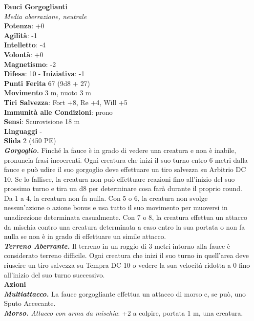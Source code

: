 \begin{multicols}{2}
\medskip\textbf{Fauci Gorgoglianti}\\
\emph{Media aberrazione, neutrale}\\
\textbf{Potenza}: +0\\
\textbf{Agilità}: -1\\
\textbf{Intelletto}: -4\\
\textbf{Volontà}: +0\\
\textbf{Magnetismo}: -2\\
\textbf{Difesa}: 10 - \textbf{Iniziativa}: -1\\
\textbf{Punti Ferita} 67 (9d8 + 27)\\
\textbf{Movimento} 3 m, nuoto 3 m\\
\textbf{Tiri Salvezza}: Fort +8, Re +4, Will +5\\
\textbf{Immunità alle Condizioni}: prono\\
\textbf{Sensi}: Scurovisione 18 m\\
\textbf{Linguaggi} -\\
\textbf{Sfida} 2 (450 PE)\smallskip\\
\emph{\textbf{Gorgoglio.}} Finché la fauce è in grado di vedere una creatura e non è inabile, pronuncia frasi incoerenti. Ogni creatura che inizi il suo turno entro 6 metri dalla fauce e può udire il suo gorgoglio deve effettuare un tiro salvezza su Arbitrio DC 10. Se lo fallisce, la creatura non può effettuare reazioni fino all'inizio del suo prossimo turno e tira un d8 per determinare cosa farà durante il proprio round. Da 1 a 4, la creatura non fa nulla. Con 5 o 6, la creatura non svolge nessun'azione o azione bonus e usa tutto il suo movimento per muoversi in unadirezione determinata casualmente. Con 7 o  8, la creatura effettua un attacco da mischia contro una creatura determinata a caso entro la sua portata o non fa nulla se non è in grado di effettuare un simile attacco.\\
\emph{\textbf{Terreno Aberrante.}} Il terreno in un raggio di 3 metri intorno alla fauce è considerato terreno difficile. Ogni creatura che inizi il suo turno in quell'area deve riuscire un tiro salvezza su Tempra DC 10 o vedere la sua velocità ridotta a 0 fino all'inizio del suo turno successivo.\\
\smallskip\textbf{Azioni}\\
\emph{\textbf{Multiattacco.}} La fauce gorgogliante effettua un attacco di morso e, se può, uno Sputo Accecante.\\
\emph{\textbf{Morso.} Attacco con arma da mischia}: +2 a colpire, portata 1 m, una creatura.\\

\end{multicols}
